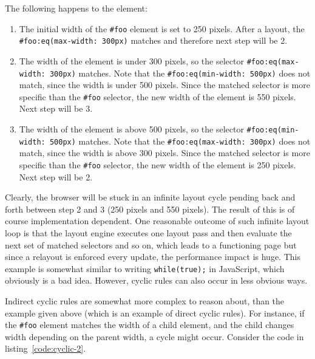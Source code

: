 \documentclass[a4paper,11pt]{kth-mag}
\newcommand{\code}[1]{\texttt{#1}}
\begin{document}
          The following happens to the element:
          \begin{enumerate}
          \item The initial width of the \code{\#foo} element is set to 250 pixels.
          After a layout, the \code{\#foo:eq(max-width: 300px)} matches and therefore next step will be 2.
          \item The width of the element is under 300 pixels, so the selector \code{\#foo:eq(max-width: 300px)} matches.
          Note that the \code{\#foo:eq(min-width: 500px)} does not match, since the width is under 500 pixels.
          Since the matched selector is more specific than the \code{\#foo} selector, the new width of the element is 550 pixels.
          Next step will be 3.
          \item The width of the element is above 500 pixels, so the selector \code{\#foo:eq(min-width: 500px)} matches.
          Note that the \code{\#foo:eq(max-width: 300px)} does not match, since the width is above 300 pixels.
          Since the matched selector is more specific than the \code{\#foo} selector, the new width of the element is 250 pixels.
          Next step will be 2.
          \end{enumerate}
          Clearly, the browser will be stuck in an infinite layout cycle pending back and forth between step 2 and 3 (250 pixels and 550 pixels).
          The result of this is of course implementation dependent.
          One reasonable outcome of such infinite layout loop is that the layout engine executes one layout pass and then evaluate the next set of matched selectors and so on, which leads to a functioning page but since a relayout is enforced every update, the performance impact is huge.
          This example is somewhat similar to writing \code{while(true);} in JavaScript, which obviously is a bad idea.
          However, cyclic rules can also occur in less obvious ways. 

          Indirect cyclic rules are somewhat more complex to reason about, than the example given above (which is an example of direct cyclic rules).
          For instance, if the \code{\#foo} element matches the width of a child element, and the child changes width depending on the parent width, a cycle might occur.
          Consider the code in listing~\ref{code:cyclic-2}.
          
\end{document}
